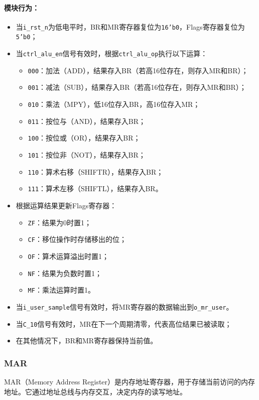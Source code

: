 \documentclass[lang=cn,a4paper,newtx]{elegantpaper}
\begin{document}
\paragraph{模块行为：}
\begin{itemize}
  \item 当\texttt{i\_rst\_n}为低电平时，BR和MR寄存器复位为\texttt{16'b0}，Flags寄存器复位为\texttt{5'b0}；
  \item 当\texttt{ctrl\_alu\_en}信号有效时，根据\texttt{ctrl\_alu\_op}执行以下运算：
    \begin{itemize}
      \item \texttt{000}：加法（ADD），结果存入BR（若高16位存在，则存入MR和BR）；
      \item \texttt{001}：减法（SUB），结果存入BR（若高16位存在，则存入MR和BR）；
      \item \texttt{010}：乘法（MPY），低16位存入BR，高16位存入MR；
      \item \texttt{011}：按位与（AND），结果存入BR；
      \item \texttt{100}：按位或（OR），结果存入BR；
      \item \texttt{101}：按位非（NOT），结果存入BR；
      \item \texttt{110}：算术右移（SHIFTR），结果存入BR；
      \item \texttt{111}：算术左移（SHIFTL），结果存入BR。
    \end{itemize}
  \item 根据运算结果更新Flags寄存器：
    \begin{itemize}
      \item \texttt{ZF}：结果为0时置1；
      \item \texttt{CF}：移位操作时存储移出的位；
      \item \texttt{OF}：算术运算溢出时置1；
      \item \texttt{NF}：结果为负数时置1；
      \item \texttt{MF}：乘法运算时置1。
    \end{itemize}
  \item 当\texttt{i\_user\_sample}信号有效时，将MR寄存器的数据输出到\texttt{o\_mr\_user}。
  \item 当\texttt{C\_10}信号有效时，MR在下一个周期清零，代表高位结果已被读取；
  \item 在其他情况下，BR和MR寄存器保持当前值。
\end{itemize}

\subsubsection{MAR}
MAR（Memory Address Register）是内存地址寄存器，用于存储当前访问的内存地址。它通过地址总线与内存交互，决定内存的读写地址。
\end{document}
